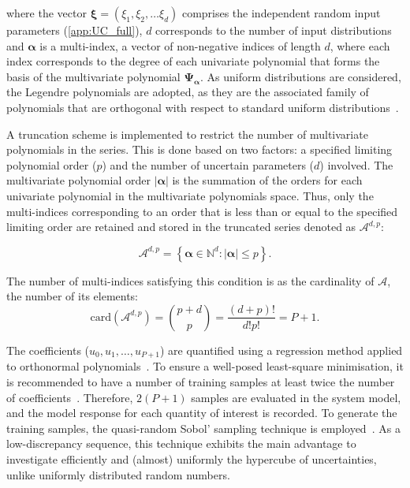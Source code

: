 \noindent where the vector $\bm{\xi} = (\xi_1,\xi_2, \dots \xi_d)$ comprises the independent random input parameters (\autoref{app:UC_full}), $d$ corresponds to the number of input distributions and $\bm{\alpha}$ is a multi-index, \ie a vector of non-negative indices of length $d$, where each index corresponds to the degree of each univariate polynomial that forms the basis of the multivariate polynomial $\bm{\Psi_{\bm{\alpha}}}$. As uniform distributions are considered, the Legendre polynomials are adopted, as they are the associated family of polynomials that are orthogonal with respect to standard uniform distributions~\cite{Sudret2014}.

A truncation scheme is implemented to restrict the number of multivariate polynomials in the series. This is done based on two factors: a specified limiting polynomial order ($p$) and the number of uncertain parameters ($d$) involved. The multivariate polynomial order $|\bm{\alpha}|$ is the summation of the orders for each univariate polynomial in the multivariate polynomials space. Thus, only the multi-indices corresponding to an order that is less than or equal to the specified limiting order are retained and stored in the truncated series denoted as $\mathcal{A}^{d,p}$:

\begin{equation}
\mathcal{A}^{d,p} = \left \{ \bm{\alpha} \in \mathbb{N}^d : |\bm{\alpha}| \leq p \right \}. 
\end{equation}

The number of multi-indices satisfying this condition is as the cardinality of $\mathcal{A}$, \ie the number of its elements:
\begin{equation}
\mathrm{card} \left( \mathcal{A}^{d,p} \right) = {p + d \choose p} = \dfrac{\left( d + p \right) !}{d! p!} = P + 1.
\label{eq:pce:nterms}
\end{equation}

The coefficients ($u_0, u_1, \dots, u_{P+1}$) are quantified using a regression method applied to orthonormal polynomials~\cite{Sudret2014}. To ensure a well-posed least-square minimisation, it is recommended to have a number of training samples at least twice the number of coefficients~\cite{Sudret2014}. Therefore, $2 \left( P+1 \right)$ samples are evaluated in the system model, and the model response for each quantity of interest is recorded. To generate the training samples, the quasi-random Sobol' sampling technique is employed~\cite{bratley2003implementing}. As a low-discrepancy sequence, this technique exhibits the main advantage to investigate efficiently and (almost) uniformly the hypercube of uncertainties, unlike uniformly distributed random numbers.

